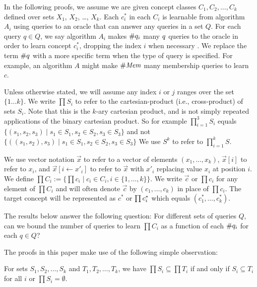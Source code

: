 In the following proofs, we assume we are given concept classes $C_1, C_2, \dots, C_k$ defined over sets $X_1$, $X_2$, \dots, $X_k$. 
Each $c^*_i$ in each $C_i$ is learnable from algorithm $A_i$ using queries to an oracle that can answer any queries in a set $Q$.  
For each query $q \in Q$, we say algorithm $A_i$ makes $\#q_{i}$ many $q$ queries to the oracle in order to learn concept $c^*_i$, dropping the index $i$ when necessary .
We replace the term $\#q$ with a more specific term when the type of query is specified.
For example, an algorithm $A$ might make $\#\emph{Mem}$ many membership queries to learn $c$. 


Unless otherwise stated, we will assume any index $i$ or $j$ ranges over the set $\{ 1 \dots k \}$.
We write $\prod S_i$ to refer to the cartesian-product (i.e., cross-product) of sets $S_i$. 
Note that this is the $k$-ary cartesian product, and is not simply repeated applications of the binary cartesian product.
So for example $\prod_{i=1}^3 S_i$ equals $\{ (s_1, s_2, s_3) \mid s_1 \in S_1, s_2 \in S_2, s_3 \in S_3 \}$ and not $\{ ((s_1, s_2), s_3) \mid s_1 \in S_1, s_2 \in S_2, s_3 \in S_3 \}$
We use $S^k$ to refer to $\prod_{i=1}^k S$. 

We use vector notation $\vec{x}$ to refer to a vector of elements $(x_1,\dots, x_k)$, $\vec{x}[i]$ to refer to $x_i$, and $\vec{x}[i \leftarrow x'_i]$ to refer to $\vec{x}$ with $x'_i$ replacing value $x_i$ at position $i$. 
We define $\prod C_i := \{ \prod c_i \mid c_i \in C_i, i \in \{1,\dots,k\} \}$. 
We write $\vec{c}$ or $\prod c_i$ for any element of $\prod C_i $ and will often denote $\vec{c}$ by $(c_1, \dots, c_k)$ in place of $\prod c_i$. 
The target concept will be represented as $c^*$ or $\prod c^*_i$ which equals $(c^*_1, \dots, c^*_k)$.



The results below answer the following question:
For different sets of queries $Q$, can we bound the number of queries to learn $\prod C_i $ as a function of each $\#q_{i}$ for each $q \in Q$?

The proofs in this paper make use of the following simple observation:
\begin{observation}
\label{subobs}
For sets $S_1, S_2, \dots, S_k$ and $T_1, T_2, \dots, T_k$, we have $\prod S_i \subseteq \prod T_i$ if and only if $S_i \subseteq T_i$ for all $i$ or $\prod S_i = \emptyset$.
\end{observation}
